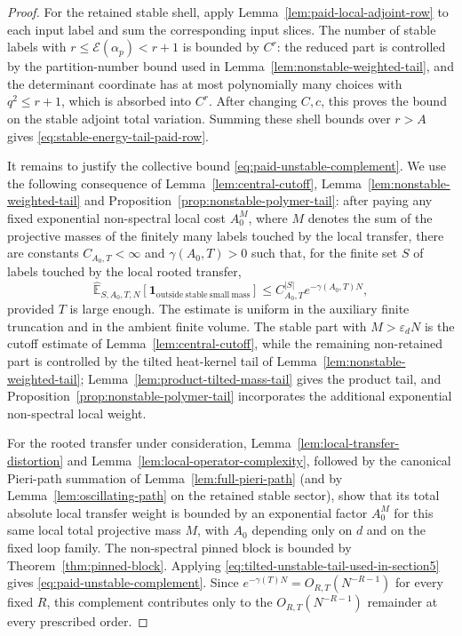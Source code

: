 \documentclass[11pt,a4paper,reqno]{amsart}
\theoremstyle{definition}
\theoremstyle{remark}
\newcommand\E{{\mathbb E}}
\begin{document}
\begin{proof}
For the retained stable shell, apply Lemma~\ref{lem:paid-local-adjoint-row} to each input label and sum the corresponding input slices.  The number of stable labels with $r\le \mathcal E(\alpha_p)<r+1$ is bounded by $C^r$: the reduced part is controlled by the partition-number bound used in Lemma~\ref{lem:nonstable-weighted-tail}, and the determinant coordinate has at most polynomially many choices with $q^2\le r+1$, which is absorbed into $C^r$.  After changing $C,c$, this proves the bound on the stable adjoint total variation. Summing these shell bounds over $r>A$ gives \eqref{eq:stable-energy-tail-paid-row}.

It remains to justify the collective bound \eqref{eq:paid-unstable-complement}.  We use the following consequence of Lemma~\ref{lem:central-cutoff}, Lemma~\ref{lem:nonstable-weighted-tail} and Proposition~\ref{prop:nonstable-polymer-tail}: after paying any fixed exponential non-spectral local cost $A_0^{M}$, where $M$ denotes the sum of the projective masses of the finitely many labels touched by the local transfer, there are constants $C_{A_0,T}<\infty$ and $\gamma(A_0,T)>0$ such that, for the finite set $S$ of labels touched by the local rooted transfer,
\begin{equation}\label{eq:tilted-unstable-tail-used-in-section5}
\widehat\E_{S,A_0,T,N}
\left[
\mathbf 1_{\mathrm{outside\ stable\ small\ mass}}
\right]
\le C_{A_0,T}^{|S|} e^{-\gamma(A_0,T)N},
\end{equation}
provided $T$ is large enough.  The estimate is uniform in the auxiliary finite truncation and in the ambient finite volume.  The stable part with $M>\varepsilon_dN$ is the cutoff estimate of Lemma~\ref{lem:central-cutoff}, while the remaining non-retained part is controlled by the tilted heat-kernel tail of Lemma~\ref{lem:nonstable-weighted-tail}; Lemma~\ref{lem:product-tilted-mass-tail} gives the product tail, and Proposition~\ref{prop:nonstable-polymer-tail} incorporates the additional exponential non-spectral local weight.

For the rooted transfer under consideration, Lemma~\ref{lem:local-transfer-distortion} and Lemma~\ref{lem:local-operator-complexity}, followed by the canonical Pieri-path summation of Lemma~\ref{lem:full-pieri-path} (and by Lemma~\ref{lem:oscillating-path} on the retained stable sector), show that its total absolute local transfer weight is bounded by an exponential factor $A_0^{M}$ for this same local total projective mass $M$, with $A_0$ depending only on $d$ and on the fixed loop family.  The non-spectral pinned block is bounded by Theorem~\ref{thm:pinned-block}.  Applying \eqref{eq:tilted-unstable-tail-used-in-section5} gives \eqref{eq:paid-unstable-complement}.  Since $e^{-\gamma(T)N}=O_{R,T}(N^{-R-1})$ for every fixed $R$, this complement contributes only to the $O_{R,T}(N^{-R-1})$ remainder at every prescribed order.
\end{proof}
\end{document}
